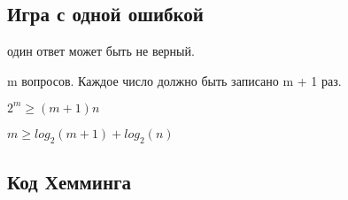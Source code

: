 \documentclass[12pt]{article}
\begin{document}
\subsection{Игра с одной ошибкой}

\begin{description}
\item [n] один ответ может быть не верный. 
\item m вопросов. Каждое число должно быть записано m + 1 раз. 

$2^m \ge (m + 1)n$

$m \ge log_2(m + 1) + log_2(n)$
\end{description}

\subsection{Код Хемминга}
\end{document}
